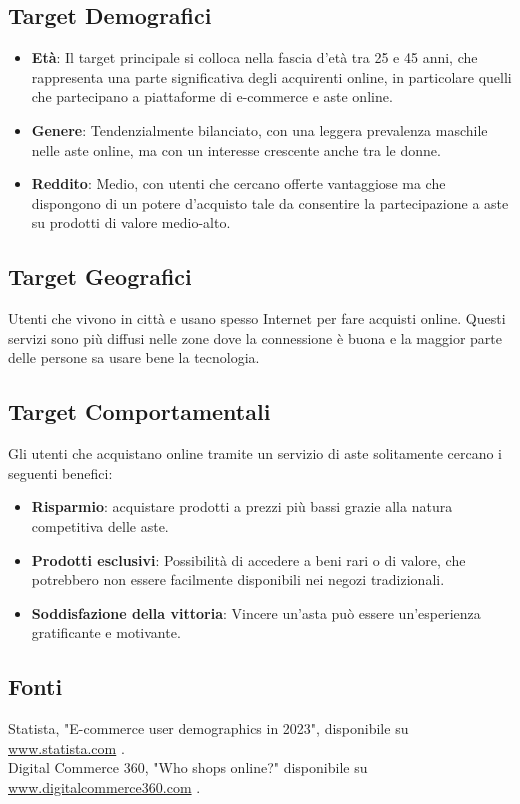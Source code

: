 \subsection*{Target Demografici}
\begin{itemize}
	\item \textbf{Età}:
	      Il target principale si colloca nella fascia d'età tra 25 e 45 anni, che rappresenta una parte significativa degli acquirenti online, in particolare quelli che partecipano a piattaforme di e-commerce e aste online.
	\item \textbf{Genere}:
	      Tendenzialmente bilanciato, con una leggera prevalenza maschile nelle aste online, ma con un interesse crescente anche tra le donne.
	\item \textbf{Reddito}:
	      Medio, con utenti che cercano offerte vantaggiose ma che dispongono di un potere d'acquisto tale da consentire la partecipazione a aste su prodotti di valore medio-alto.
\end{itemize}

\subsection*{Target Geografici}
Utenti che vivono in città e usano spesso Internet per fare acquisti online.
Questi servizi sono più diffusi nelle zone dove la connessione è buona e la maggior parte delle persone sa usare bene la tecnologia.

\subsection*{Target Comportamentali}
Gli utenti che acquistano online tramite un servizio di aste solitamente cercano i seguenti benefici:
\begin{itemize}
	\item \textbf{Risparmio}: acquistare prodotti a prezzi più bassi grazie alla natura competitiva delle aste.
	\item \textbf{Prodotti esclusivi}: Possibilità di accedere a beni rari o di valore, che potrebbero non essere facilmente disponibili nei negozi tradizionali.
	\item \textbf{Soddisfazione della vittoria}: Vincere un'asta può essere un'esperienza gratificante e motivante.
\end{itemize}

\subsection*{Fonti}
Statista, "E-commerce user demographics in 2023", disponibile su \url{www.statista.com} .\\
Digital Commerce 360, "Who shops online?" disponibile su \url{www.digitalcommerce360.com} .


